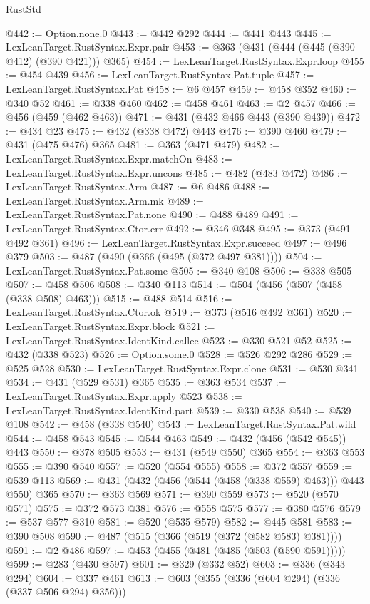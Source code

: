\begin{lexlean}{RustStd}
\begin{coremodule}
@442 := Option.none.{0}
@443 := @442 @292
@444 := @441 @443
@445 := LexLeanTarget.RustSyntax.Expr.pair
@453 := @363 (@431 (@444 (@445 (@390 @412) (@390 @421))) @365)
@454 := LexLeanTarget.RustSyntax.Expr.loop
@455 := @454 @439
@456 := LexLeanTarget.RustSyntax.Pat.tuple
@457 := LexLeanTarget.RustSyntax.Pat
@458 := @6 @457
@459 := @458 @352
@460 := @340 @52
@461 := @338 @460
@462 := @458 @461
@463 := @2 @457
@466 := @456 (@459 (@462 @463))
@471 := @431 (@432 @466 @443 (@390 @439))
@472 := @434 @23
@475 := @432 (@338 @472) @443
@476 := @390 @460
@479 := @431 (@475 @476) @365
@481 := @363 (@471 @479)
@482 := LexLeanTarget.RustSyntax.Expr.matchOn
@483 := LexLeanTarget.RustSyntax.Expr.uncons
@485 := @482 (@483 @472)
@486 := LexLeanTarget.RustSyntax.Arm
@487 := @6 @486
@488 := LexLeanTarget.RustSyntax.Arm.mk
@489 := LexLeanTarget.RustSyntax.Pat.none
@490 := @488 @489
@491 := LexLeanTarget.RustSyntax.Ctor.err
@492 := @346 @348
@495 := @373 (@491 @492 @361)
@496 := LexLeanTarget.RustSyntax.Expr.succeed
@497 := @496 @379
@503 := @487 (@490 (@366 (@495 (@372 @497 @381))))
@504 := LexLeanTarget.RustSyntax.Pat.some
@505 := @340 @108
@506 := @338 @505
@507 := @458 @506
@508 := @340 @113
@514 := @504 (@456 (@507 (@458 (@338 @508) @463)))
@515 := @488 @514
@516 := LexLeanTarget.RustSyntax.Ctor.ok
@519 := @373 (@516 @492 @361)
@520 := LexLeanTarget.RustSyntax.Expr.block
@521 := LexLeanTarget.RustSyntax.IdentKind.callee
@523 := @330 @521 @52
@525 := @432 (@338 @523)
@526 := Option.some.{0}
@528 := @526 @292 @286
@529 := @525 @528
@530 := LexLeanTarget.RustSyntax.Expr.clone
@531 := @530 @341
@534 := @431 (@529 @531) @365
@535 := @363 @534
@537 := LexLeanTarget.RustSyntax.Expr.apply @523
@538 := LexLeanTarget.RustSyntax.IdentKind.part
@539 := @330 @538
@540 := @539 @108
@542 := @458 (@338 @540)
@543 := LexLeanTarget.RustSyntax.Pat.wild
@544 := @458 @543
@545 := @544 @463
@549 := @432 (@456 (@542 @545)) @443
@550 := @378 @505
@553 := @431 (@549 @550) @365
@554 := @363 @553
@555 := @390 @540
@557 := @520 (@554 @555)
@558 := @372 @557
@559 := @539 @113
@569 := @431 (@432 (@456 (@544 (@458 (@338 @559) @463))) @443 @550) @365
@570 := @363 @569
@571 := @390 @559
@573 := @520 (@570 @571)
@575 := @372 @573 @381
@576 := @558 @575
@577 := @380 @576
@579 := @537 @577 @310
@581 := @520 (@535 @579)
@582 := @445 @581
@583 := @390 @508
@590 := @487 (@515 (@366 (@519 (@372 (@582 @583) @381))))
@591 := @2 @486
@597 := @453 (@455 (@481 (@485 (@503 (@590 @591)))))
@599 := @283 (@430 @597)
@601 := @329 (@332 @52)
@603 := @336 (@343 @294)
@604 := @337 @461
@613 := @603 (@355 (@336 (@604 @294) (@336 (@337 @506 @294) @356)))

\end{coremodule}
\end{lexlean}
